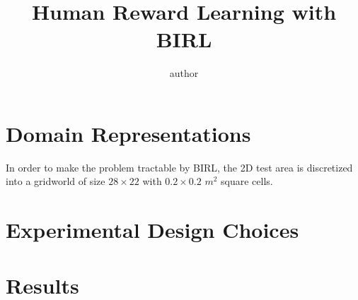 \documentclass[12pt]{article}
\title{\LARGE \bf  Human Reward Learning with BIRL }
\author{author}
\begin{document}
\thispagestyle{fancy}
    \maketitle
    \pagestyle{fancy}

\section{Domain Representations}

In order to make the problem tractable by BIRL, the 2D test area is discretized into a gridworld of size $28\times 22$ with $0.2 \times 0.2$ $m^2$ square cells.  

\section{Experimental Design Choices}

\section{Results}
\end{document}

